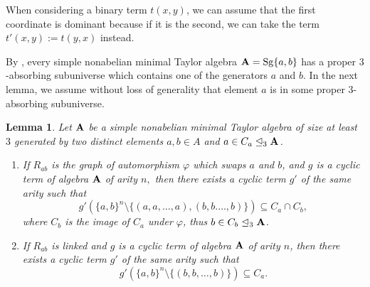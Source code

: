 \documentclass[11pt]{amsart}
\newcommand{\m}[1]{\mathbf{\uppercase{#1}}}
\newtheorem{lem}[thm]{Lemma}
\theoremstyle{definition}
\theoremstyle{remark}
\theoremstyle{plain}
\begin{document}
When considering a binary term $t(x,y)$, we can assume that the first coordinate is dominant because if it is the second, we can take the term $t'(x,y):= t(y,x)$ instead.

By , every simple nonabelian minimal Taylor algebra ${\m A}=\mathrm{Sg}\{a,b\}$ has a proper $3$-absorbing subuniverse which contains one of the generators $a$ and $b$. In the next lemma, we assume without loss of generality that element $a$ is in some proper $3$-absorbing subuniverse. 

\begin{lem}\label{lemma1}
Let ${\m A}$ be a simple nonabelian minimal Taylor algebra of size at least $3$ generated by two distinct elements $a,b\in A$ and $a\in C_a\trianglelefteq_3 {\m A}$.
\begin{enumerate}
\item[a)] If $R_{ab}$ is the graph of automorphism $\varphi$ which swaps $a$ and $b$, and $g$ is a cyclic term of algebra ${\m A}$ of arity $n,$ then there exists a cyclic term $g'$ of the same arity such that 
$$g'(\{a,b\}^{n}\setminus\{(a,a,\dotso, a), (b,b.\dotso, b)\})\subseteq C_a\cap C_b,$$
where $C_b$ is the image of $C_a$ under $\varphi$, thus $b\in C_b\trianglelefteq_3 {\m A}$.
\item[b)] If $R_{ab}$ is linked and $g$ is a cyclic term of algebra ${\m A}$ of arity $n$, then there exists a cyclic term $g'$ of the same arity such that  
$$g'(\{a,b\}^{n}\setminus\{(b,b,\dotso, b)\})\subseteq C_a.$$
\end{enumerate}
\end{lem} 
\end{document}
